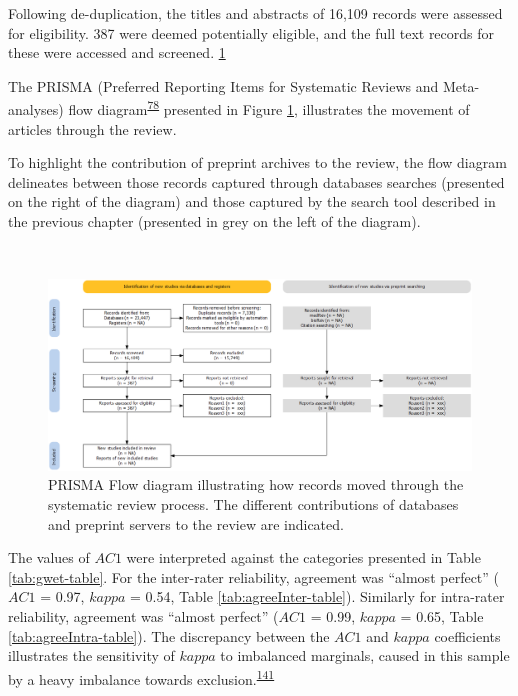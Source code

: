 \documentclass[a4paper, twoside]{templates/ociamthesis}
\newcommand{\blandscape}{\begin{landscape}}
\newcommand{\elandscape}{\end{landscape}}
\begin{document}
Following de-duplication, the titles and abstracts of 16,109 records were assessed for eligibility. 387 were deemed potentially eligible, and the full text records for these were accessed and screened. \ref{fig:prisma-flow-fig}

The PRISMA (Preferred Reporting Items for Systematic Reviews and Meta-analyses) flow diagram\textsuperscript{\protect\hyperlink{ref-page2021}{78}} presented in Figure \ref{fig:prisma-flow-fig}, illustrates the movement of articles through the review.

To highlight the contribution of preprint archives to the review, the flow diagram delineates between those records captured through databases searches (presented on the right of the diagram) and those captured by the search tool described in the previous chapter (presented in grey on the left of the diagram).

\blandscape{}

~





\begin{figure}[H]
\includegraphics[width=1\linewidth]{figures/sys-rev/prismaflow} \caption[PRISMA flow diagram]{PRISMA Flow diagram illustrating how records moved through the systematic review process. The different contributions of databases and preprint servers to the review are indicated.}\label{fig:prisma-flow-fig}
\end{figure}

\elandscape{}

The values of \(AC1\) were interpreted against the categories presented in Table \ref{tab:gwet-table}. For the inter-rater reliability, agreement was ``almost perfect'' (\(AC1\) = 0.97, \(kappa\) = 0.54, Table \ref{tab:agreeInter-table}). Similarly for intra-rater reliability, agreement was ``almost perfect'' (\(AC1\) = 0.99, \(kappa\) = 0.65, Table \ref{tab:agreeIntra-table}). The discrepancy between the \(AC1\) and \(kappa\) coefficients illustrates the sensitivity of \(kappa\) to imbalanced marginals, caused in this sample by a heavy imbalance towards exclusion.\textsuperscript{\protect\hyperlink{ref-feinstein1990}{141}}
\end{document}
